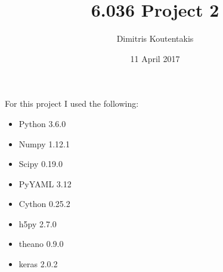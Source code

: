 \documentclass[letterpaper, 12pt]{article}
\begin{document}
\title{6.036 Project 2 \vspace{8mm}}
\author{ Dimitris Koutentakis}
\date{11 April 2017}
\maketitle
For this project I used the following:
\begin{itemize}
    \item Python 3.6.0
    \item Numpy 1.12.1
    \item Scipy 0.19.0
    \item PyYAML 3.12
    \item Cython 0.25.2
    \item h5py 2.7.0
    \item theano 0.9.0
    \item keras 2.0.2
    \clearpage
\end{itemize}
\end{document}
